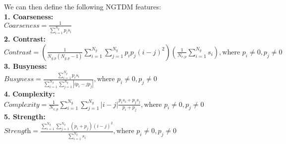 We can then define the following NGTDM features:\\
\textbf{1. Coarseness:}\\
$\textit{Coarseness}=\frac{1}{\sum _{i=1}^{N_{g}}p_{i}s_{i}}$\\
\textbf{2. Contrast:}\\
$\textit{Contrast}=\left(\frac{1}{N_{g,p}\left(N_{g,p}-1\right)}\sum _{i=1}^{N_{g}}\sum _{j=1}^{N_{g}}p_{i}p_{j}\left(i-j\right)^{2}\right)\left(\frac{1}{N_{v,p}}\sum _{i=1}^{N_{g}}s_{i}\right),\text{where } p_{i}\neq 0,p_{j}\neq 0$\\
\textbf{3. Busyness:}\\
$\textit{Busyness}=\frac{\sum _{i=1}^{N_{g}}{p_{i}}s_{i}}{\sum _{i=1}^{N_{g}}\sum _{j=1}^{N_{g}}\left|ip_{i}-jp_{j}\right|} ,\text{where } p_{i}\neq 0,p_{j}\neq 0$ \\
\textbf{4.} \textbf{Complexity:}\\
$\textit{Complexity}=\frac{1}{N_{v,p}}\sum _{i=1}^{N_{g}} \sum _{j=1}^{N_{g}}\left|i-j\right| \frac{{p_{i}}s_{i}+{p_{j}}s_{j}}{p_{i}+p_{j}},\text{where } p_{i}\neq 0,p_{j}\neq 0$ \\
\textbf{5. Strength:}\\
$\textit{Strength}=\frac{\sum _{i=1}^{N_{g}}\sum _{j=1}^{N_{g}}\left(p_{i}+p_{j}\right)\left(i-j\right)^{2}}{\sum _{i=1}^{N_{g}}s_{i}},\text{where } p_{i}\neq 0,p_{j}\neq 0$


